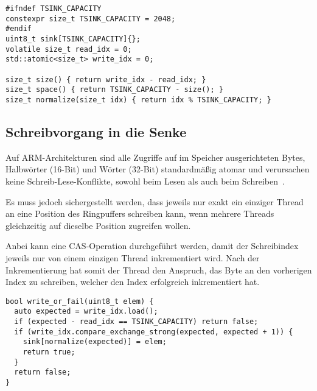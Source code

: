 \begin{code}
\begin{verbatim}
#ifndef TSINK_CAPACITY
constexpr size_t TSINK_CAPACITY = 2048;
#endif
uint8_t sink[TSINK_CAPACITY]{};
volatile size_t read_idx = 0;
std::atomic<size_t> write_idx = 0;

size_t size() { return write_idx - read_idx; }
size_t space() { return TSINK_CAPACITY - size(); }
size_t normalize(size_t idx) { return idx % TSINK_CAPACITY; }
\end{verbatim}
\end{code}

\subsection{Schreibvorgang in die Senke}

Auf ARM-Architekturen sind alle Zugriffe auf im Speicher ausgerichteten Bytes,
Halbwörter (16-Bit) und Wörter (32-Bit) standardmäßig atomar und verursachen
keine Schreib-Lese-Konflikte, sowohl beim Lesen als auch beim Schreiben~\cite[S.
A3-79]{ARM_DDI0403_EE}.

Es muss jedoch sichergestellt werden, dass jeweils nur exakt ein einziger Thread
an eine Position des Ringpuffers schreiben kann, wenn mehrere Threads
gleichzeitig auf dieselbe Position zugreifen wollen.

Anbei kann eine \ac{CAS}-Operation durchgeführt werden, damit der Schreibindex
jeweils nur von einem einzigen Thread inkrementiert wird. Nach der
Inkrementierung hat somit der Thread den Anspruch, das Byte an den vorherigen
Index zu schreiben, welcher den Index erfolgreich inkrementiert hat.

\begin{code}
\begin{verbatim}
bool write_or_fail(uint8_t elem) {
  auto expected = write_idx.load();
  if (expected - read_idx == TSINK_CAPACITY) return false;
  if (write_idx.compare_exchange_strong(expected, expected + 1)) {
    sink[normalize(expected)] = elem;
    return true;
  }
  return false;
}
\end{verbatim}
\end{code}

